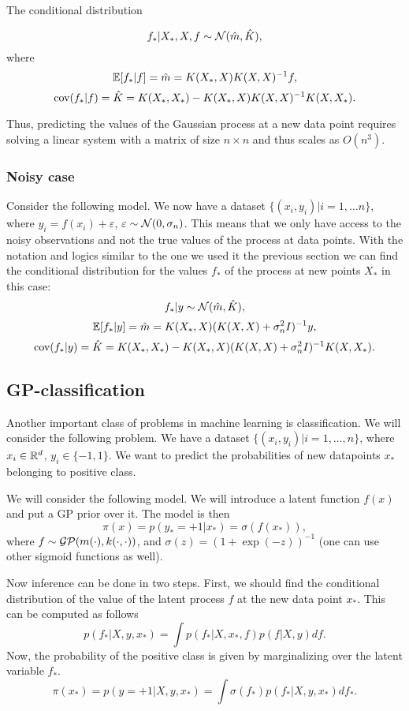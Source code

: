 \documentclass[12pt]{article}
\begin{document}
	The conditional distribution
	
	$$f_* | X_*, X, f \sim \mathcal{N}( \hat m, \hat K ),$$
	where 
	$$\mathbb{E} [f_* | f ] = \hat m = K(X_*, X) K(X, X)^{-1} f,$$
	$$\mbox{cov}(f_* | f ) = \hat K = K(X_*, X_*) - K(X_*, X)K(X, X)^{-1}K(X, X_*).$$
		
	Thus, predicting the values of the Gaussian process at a new data point requires solving a linear system with a matrix of size $n \times n$ and thus scales as $O(n^3)$.
	
	\subsubsection{Noisy case}
		\hspace{0.6cm}Consider the following model. We now have a dataset $\{(x_i, y_i)| i = 1, \ldots n\}$, where $y_i = f(x_i) + \varepsilon$, $\varepsilon \sim \mathcal{N}(0, \sigma_n)$. This means that we only have access to the noisy observations and not the true values of the process at data points. With the notation and logics similar to the one we used it the previous section we can find the conditional distribution for the values $f_*$ of the process at new points $X_*$ in this case:
		$$f_* | y \sim \mathcal{N}( \hat m, \hat K ),$$
		$$\mathbb{E}[f_* | y] = \hat m = K(X_*, X) (K(X, X) + \sigma_n^2 I)^{-1} y,$$
		$$\mbox{cov}(f_* | y ) = \hat K = K(X_*, X_*) - K(X_*, X)(K(X, X) + \sigma_n^2 I)^{-1}K(X, X_*).$$
		
\subsection{GP-classification}
	\label{gp-classification}
	\hspace{0.6cm}Another important class of problems in machine learning is classification. We will consider the following problem. We have a dataset $\{(x_i, y_i) | i = 1, \ldots, n\}$, where $x_i \in \mathbb{R}^d$, $y_i \in \{-1, 1\}$. We want to predict the probabilities of new datapoints $x_*$ belonging to positive class.

	We will consider the following model. We will introduce a latent function $f(x)$ and put a GP prior over it. The model is then
	$$\pi(x) = p(y_* = +1 | x_*) = \sigma(f(x_*)),$$
	where $f \sim \mathcal{GP}(m(\cdot), k(\cdot, \cdot))$, and $\sigma(z) = (1 + \exp(-z))^{-1}$ (one can use other sigmoid functions as well).

	Now inference can be done in two steps. First, we should find the conditional distribution of the value of the latent process $f$ at the new data point $x_*$. This can be computed as follows
	\begin{equation}
		\label{classification_conditional}
		p(f_* | X, y, x_*) = \int p(f_* | X, x_*, f) p(f | X, y) df.
	\end{equation}
	Now, the probability of the positive class is given by marginalizing over the latent variable $f_*$.
	\begin{equation}
		\label{classification_class_probability}
		\pi(x_*) = p(y = +1 | X, y, x_*) = \int \sigma(f_*) p(f_* | X, y, x_*) df_*.
	\end{equation}
\end{document}
